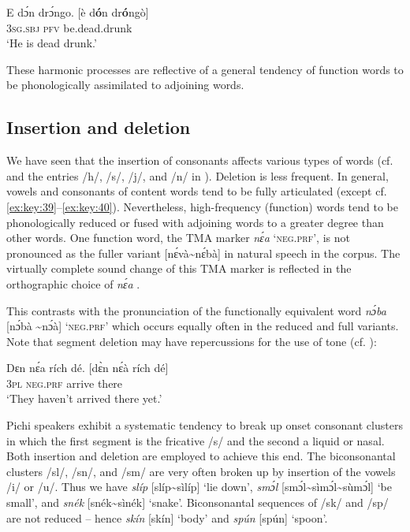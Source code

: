 \ea%
    \label{ex:key:37}
    \gll   E    dɔ́n    drɔ́ngo.        \textup{[è d\textbf{ó}n dr\textbf{ó}ngò]}\\
\textsc{3sg.sbj}  \textsc{pfv}    be.dead.drunk\\

\glt ‘He is dead drunk.’
\z

These harmonic processes are reflective of a general tendency of function words to be phonologically assimilated to adjoining words. 

\subsection{Insertion and deletion}\label{sec:2.5.4}

We have seen that the insertion of consonants affects various types of words (cf.  and the entries /h/, /s/, /j/, and /n/ in ). Deletion is less frequent. In general, vowels and consonants of content words tend to be fully articulated (except cf. \ref{ex:key:39}–\ref{ex:key:40}). Nevertheless, high-frequency (function) words tend to be phonologically reduced or fused with adjoining words to a greater degree than other words. One function word, the TMA marker \textit{nɛ́a} ‘\textsc{neg.prf}’, is not pronounced as the fuller variant [nɛ́và{\textasciitilde}nɛ́bà] in natural speech in the corpus. The virtually complete sound change of this TMA marker is reflected in the orthographic choice of \textit{nɛ́a} . 


This contrasts with the pronunciation of the functionally equivalent word \textit{nɔ́ba} [nɔ́bà {\textasciitilde}nɔ́à] ‘\textsc{neg}.\textsc{prf}’ which occurs equally often in the reduced and full variants. Note that segment deletion may have repercussions for the use of tone (cf. ): 



\ea%
    \label{ex:key:38}
    \gll   Dɛn    nɛ́a    rích    dé.       \textup{[dɛ̀n    nɛ́à    rích    dé]}\\
\textsc{3pl}    \textsc{neg}.\textsc{prf}  arrive  there\\

\glt ‘They haven’t arrived there yet.’
\z

Pichi speakers exhibit a systematic tendency to break up onset consonant clusters in which the first segment is the fricative /s/ and the second a liquid or nasal. Both insertion and deletion are employed to achieve this end. The biconsonantal clusters /sl/, /sn/, and /sm/ are very often broken up by insertion of the vowels /i/ or /u/. Thus we have \textit{slíp} [slíp{\textasciitilde}sìlíp] ‘lie down’, \textit{smɔ́l} [smɔ́l{\textasciitilde}sìmɔ́l{\textasciitilde}sùmɔ́l] ‘be small’, and \textit{snék} [snék{\textasciitilde}sìnék] ‘snake’. Biconsonantal sequences of /sk/ and /sp/ are not reduced – hence \textit{skín} [skín] ‘body’ and \textit{spún} [spún] ‘spoon’. 


